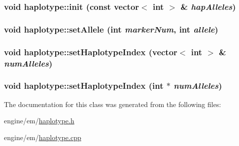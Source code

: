 \label{classhaplotype_a863464fe488a5dc02f31a4c82c960ff5}
\hypertarget{classhaplotype_a9e5a39c538681cb99c39e0c2d2627673}{
\subsubsection[{init}]{\setlength{\rightskip}{0pt plus 5cm}void haplotype::init (const vector$<$ int $>$ \& {\em hapAlleles})}}
\label{classhaplotype_a9e5a39c538681cb99c39e0c2d2627673}
\hypertarget{classhaplotype_a74f664299f5a379138fd3aadbedca66c}{
\subsubsection[{setAllele}]{\setlength{\rightskip}{0pt plus 5cm}void haplotype::setAllele (int {\em markerNum}, \/  int {\em allele})}}
\label{classhaplotype_a74f664299f5a379138fd3aadbedca66c}
\hypertarget{classhaplotype_aa4aa7f5546b0e858e53992b20771ecaa}{
\subsubsection[{setHaplotypeIndex}]{\setlength{\rightskip}{0pt plus 5cm}void haplotype::setHaplotypeIndex (vector$<$ int $>$ \& {\em numAlleles})}}
\label{classhaplotype_aa4aa7f5546b0e858e53992b20771ecaa}
\hypertarget{classhaplotype_a84a5c1e79a3d9233ae1111c6027256e8}{
\subsubsection[{setHaplotypeIndex}]{\setlength{\rightskip}{0pt plus 5cm}void haplotype::setHaplotypeIndex (int $\ast$ {\em numAlleles})}}
\label{classhaplotype_a84a5c1e79a3d9233ae1111c6027256e8}


The documentation for this class was generated from the following files:\begin{DoxyCompactItemize}
\item 
engine/em/\hyperlink{haplotype_8h}{haplotype.h}\item 
engine/em/\hyperlink{haplotype_8cpp}{haplotype.cpp}\end{DoxyCompactItemize}
